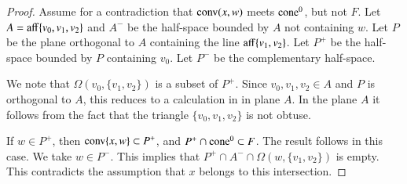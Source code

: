 \begin{proof} 
Assume for a contradiction that ${\operatorname{conv}}(x,w)$ meets ${\operatorname{cone}}^0$,
but not $F$.  Let $A = {\operatorname{aff}}\{v_0,v_1,v_2\}$ and $A^-$
be the half-space bounded by $A$ not containing $w$. 
Let $P$
be the plane orthogonal to $A$ containing the line ${\operatorname{aff}}\{v_1,v_2\}$.
Let $P^+$ be the half-space bounded by $P$ containing $v_0$.  Let
$P^-$ be the complementary half-space.

We note that $\Omega(v_0,\{v_1,v_2\})$ is a subset of $P^+$.  Since
$v_0,v_1,v_2\in A$ and $P$ is orthogonal to $A$, this reduces to
a calculation in in plane $A$.  In the plane $A$ it follows from
the fact that the triangle $\{v_0,v_1,v_2\}$ is not obtuse.

If $w\in P^+$, then ${\operatorname{conv}}\{x,w\}\subset P^+$, and
$P^+\cap {\operatorname{cone}}^0 \subset F$.  The result follows in this case.
We take $w\in P^-$.  This implies that $P^+\cap A^-\cap \Omega(w,\{v_1,v_2\})$
is empty.  This contradicts the assumption that $x$ belongs to this
intersection.
%
%
%
%
%
%
% 
\end{proof} 

